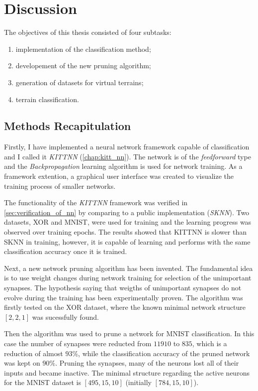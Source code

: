\chapter{Discussion} \label{chap:discussion}
The objectives of this thesis consisted of four subtasks:

\begin{enumerate}
\item implementation of the classification method;
\item developement of the new pruning algorithm;
\item generation of datasets for virtual terrains;
\item terrain classification.
\end{enumerate}

\section{Methods Recapitulation} \label{sec:dis:methods_recap}
Firstly, I have implemented a neural network framework capable of classification and I called it \textit{KITTNN} (\cref{chap:kitt_nn}). The network is of the \textit{feedforward} type and the \textit{Backpropagation} learning algorithm is used for network training. As a framework extention, a graphical user interface was created to visualize the training process of smaller networks.

The functionality of the \textit{KITTNN} framework was verified in \cref{sec:verification_of_nn} by comparing to a public implementation (\textit{SKNN}). Two datasets, XOR and MNIST, were used for training and the learning progress was observed over training epochs. The results showed that KITTNN is slower than SKNN in training, however, it is capable of learning and performs with the same classification accuracy once it is trained.

Next, a new network pruning algorithm has been invented. The fundamental idea is to use weight changes during network training for selection of the unimportant synapses. The hypothesis saying that weigths of unimportant synapses do not evolve during the training has been experimentally proven. The algorithm was firstly tested on the XOR dataset, where the known minimal network structure $ [2, 2, 1] $ was sucessfully found.

Then the algorithm was used to prune a network for MNIST classification. In this case the number of synapses were reducted from $ 11910 $ to $ 835 $, which is a reduction of almost $ 93\% $, while the classification accuracy of the pruned network was kept on $ 90\% $. Pruning the synapses, many of the neurons lost all of their inputs and became inactive. The minimal structure regarding the active neurons for the MNIST dataset is $ [495, 15, 10] $ (initially $ [784, 15, 10] $). 

